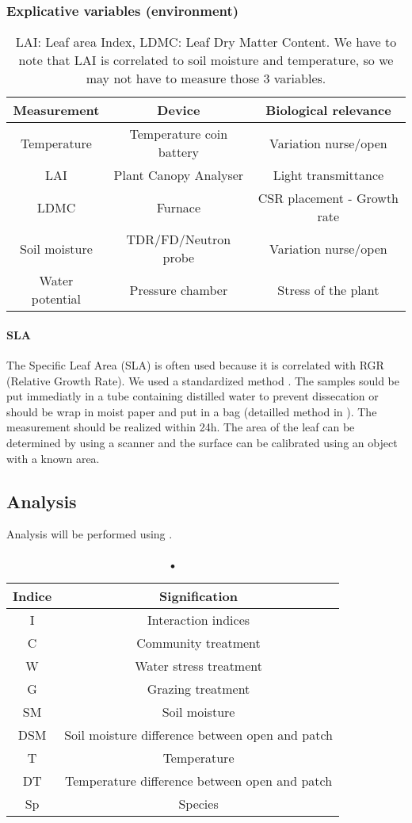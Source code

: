 \documentclass[12pt, a4paper]{article} %
\begin{document}
\subsubsection{Explicative variables (environment)}
\begin{table}[h]
\begin{center}
\begin{tabular}{ccc}
Measurement & Device & Biological relevance\\
\hline
Temperature & Temperature coin battery & Variation nurse/open\\
LAI & Plant Canopy Analyser & Light transmittance\\
LDMC & Furnace & CSR placement - Growth rate\\
Soil moisture & TDR/FD/Neutron probe & Variation nurse/open\\
Water potential & Pressure chamber & Stress of the plant\\
\hline 
\end{tabular}
\caption{LAI: Leaf area Index, LDMC: Leaf Dry Matter Content. We have to note that LAI is correlated to soil moisture and temperature, so we may not have to measure those 3 variables.}
\end{center}
\end{table}

\paragraph{SLA}
The Specific Leaf Area (SLA) is often used because it is correlated with RGR (Relative Growth Rate). We used a standardized method \citet{perez-harguindeguy_new_2013}. The samples sould be put immediatly in a tube containing distilled water to prevent dissecation or should be wrap in moist paper and put in a bag (detailled method in \citep{perez-harguindeguy_new_2013}). The measurement should be realized within 24h. The area of the leaf can be determined by using a scanner and the surface can be calibrated using an object with a known area.
\subsection{Analysis}
Analysis will be performed using \citep{RCoreTeam2015}.
\begin{table}[h]
\begin{center}
\begin{tabular}{cc}
Indice & Signification\\
\hline
I   & Interaction indices\\
C   & Community treatment\\
W   & Water stress treatment\\
G   & Grazing treatment\\
SM  & Soil moisture\\
DSM & Soil moisture difference between open and patch\\
T   & Temperature \\
DT  & Temperature difference between open and patch \\
Sp  & Species \\
\hline 
\end{tabular}
\caption{•}
\end{center}
\end{table}
\end{document}
